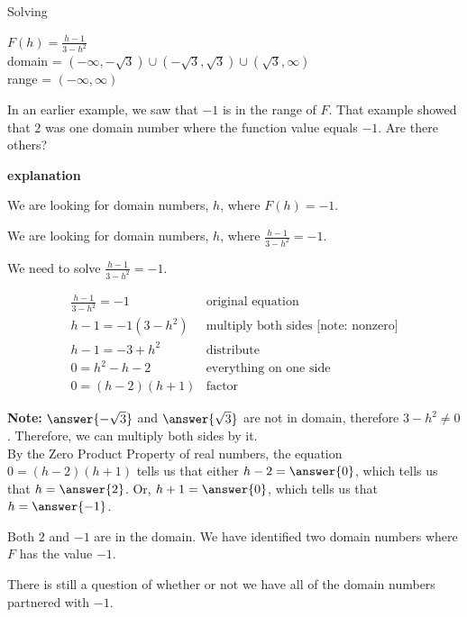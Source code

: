 \documentclass{ximera}
\begin{document}
\begin{example}   Solving 

$F(h) = \frac{h-1}{3-h^2}$ \\
domain = $(-\infty, -\sqrt{3}) \cup (-\sqrt{3}, \sqrt{3}) \cup (\sqrt{3}, \infty)$ \\
range = $(-\infty, \infty)$


In an earlier example, we saw that $-1$ is in the range of $F$.  That example showed that $2$ was one domain number where the function value equals $-1$. Are there others?



\textbf{\textcolor{red!75!green}{explanation}} 

We are looking for domain numbers, $h$, where $F(h) = -1$.  

We are looking for domain numbers, $h$, where $\frac{h-1}{3-h^2} = -1$.  

We need to solve $\frac{h-1}{3-h^2} = -1$.



\[
\begin{array}{ll}
\frac{h-1}{3-h^2} = -1 &  \text{original equation} \\
h - 1 = -1 (3-h^2)    &  \text{multiply both sides [note: nonzero]} \\
h - 1 = -3 + h^2    &      \text{distribute} \\
0 = h^2 - h - 2    &      \text{everything on one side} \\
0 =(h-2)(h+1)    &   \text{factor}   
\end{array}
\]



\textbf{Note:}  $\answer{-\sqrt{3}}$ and $\answer{\sqrt{3}}$ are not in domain, therefore $3 - h^2 \ne 0$. Therefore, we can multiply both sides by it.  \\



By the Zero Product Property of real numbers, the equation $0 =(h-2)(h+1)$ tells us that either $h-2 = \answer{0}$, which tells us that $h = \answer{2}$. Or, $h+1 = \answer{0}$, which tells us that $h = \answer{-1}$.

Both $2$ and $-1$ are in the domain.  We have identified two domain numbers where $F$ has the value $-1$.



\end{example}


There is still a question of whether or not we have all of the domain numbers partnered with $-1$. 
\end{document}
